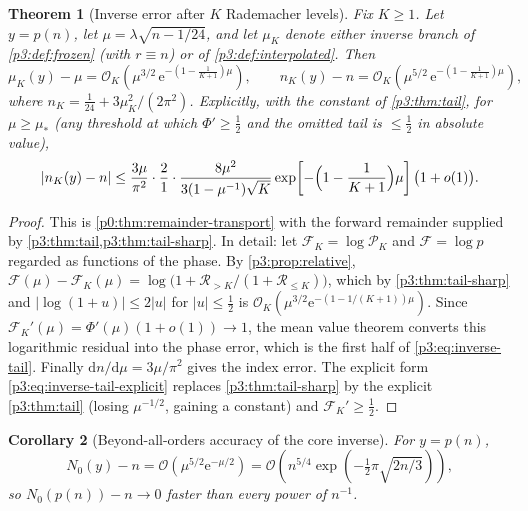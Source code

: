 \documentclass[11pt,a4paper,oneside]{book}
\theoremstyle{plain}
\newtheorem{theorem}{Theorem}[chapter]
\newtheorem{corollary}[theorem]{Corollary}
\theoremstyle{definition}
\theoremstyle{remark}
\newcommand{\e}{\mathrm{e}}
\newcommand{\dd}{\mathrm{d}}
\newcommand{\bigO}{\mathcal{O}}
\newcommand{\littleo}{o}
\begin{document}
\begin{theorem}[Inverse error after $K$ Rademacher levels]\label{p3:thm:inverse-tail}
Fix $K\ge1$. Let $y=p(n)$, let $\mu=\lambda\sqrt{n-1/24}$, and let $\mu_{K}$ denote either inverse
branch of \cref{p3:def:frozen} (with $r\equiv n$) or of \cref{p3:def:interpolated}. Then
\begin{equation}\label{p3:eq:inverse-tail}
 \mu_{K}(y)-\mu=\bigO_{K}\!\left(\mu^{3/2}\,
 \e^{-(1-\frac1{K+1})\mu}\right),
 \qquad
 n_{K}(y)-n=\bigO_{K}\!\left(\mu^{5/2}\,\e^{-(1-\frac1{K+1})\mu}\right),
\end{equation}
where $n_{K}=\frac1{24}+3\mu_{K}^{2}/(2\pi^{2})$. Explicitly, with the constant of
\cref{p3:thm:tail}, for $\mu\ge\mu_{*}$ (any threshold at which $\Phi'\ge\tfrac12$ and the omitted
tail is $\le\tfrac12$ in absolute value),
\begin{equation}\label{p3:eq:inverse-tail-explicit}
 |n_{K}(y)-n|\le\frac{3\mu}{\pi^{2}}\cdot\frac{2}{1}\cdot
 \frac{8\mu^{2}}{3(1-\mu^{-1})\sqrt K}
 \exp\!\left[-\Bigl(1-\frac1{K+1}\Bigr)\mu\right]
 \bigl(1+\littleo(1)\bigr).
\end{equation}
\end{theorem}

\begin{proof}
This is \cref{p0:thm:remainder-transport} with the forward remainder supplied by
\cref{p3:thm:tail,p3:thm:tail-sharp}. In detail: let $\mathcal{F}_{K}=\log\mathcal{P}_{K}$ and
$\mathcal{F}=\log p$ regarded as functions of the phase. By \cref{p3:prop:relative},
$\mathcal{F}(\mu)-\mathcal{F}_{K}(\mu) =\log\bigl(1+\mathcal{R}_{>K}/(1+\mathcal{R}_{\le
K})\bigr)$, which by \cref{p3:thm:tail-sharp} and $|\log(1+u)|\le2|u|$ for $|u|\le\tfrac12$ is
$\bigO_{K}(\mu^{3/2}\e^{-(1-1/(K+1))\mu})$. Since
$\mathcal{F}_{K}'(\mu)=\Phi'(\mu)(1+\littleo(1))\to1$, the mean value theorem converts this
logarithmic residual into the phase error, which is the first half of \cref{p3:eq:inverse-tail}.
Finally $\dd n/\dd\mu=3\mu/\pi^{2}$ gives the index error. The explicit form
\cref{p3:eq:inverse-tail-explicit} replaces \cref{p3:thm:tail-sharp} by the explicit
\cref{p3:thm:tail} (losing $\mu^{-1/2}$, gaining a constant) and $\mathcal{F}_{K}'\ge\tfrac12$.
\end{proof}

\begin{corollary}[Beyond-all-orders accuracy of the core inverse]
\label{p3:cor:core-inverse-error}
For $y=p(n)$,
\begin{equation}\label{p3:eq:core-error}
 N_{0}(y)-n=\bigO\!\left(\mu^{5/2}\e^{-\mu/2}\right)
 =\bigO\!\left(n^{5/4}\exp\!\left(-\tfrac12\pi\sqrt{2n/3}\right)\right),
\end{equation}
so $N_{0}(p(n))-n\to0$ faster than every power of $n^{-1}$.
\end{corollary}
\end{document}

